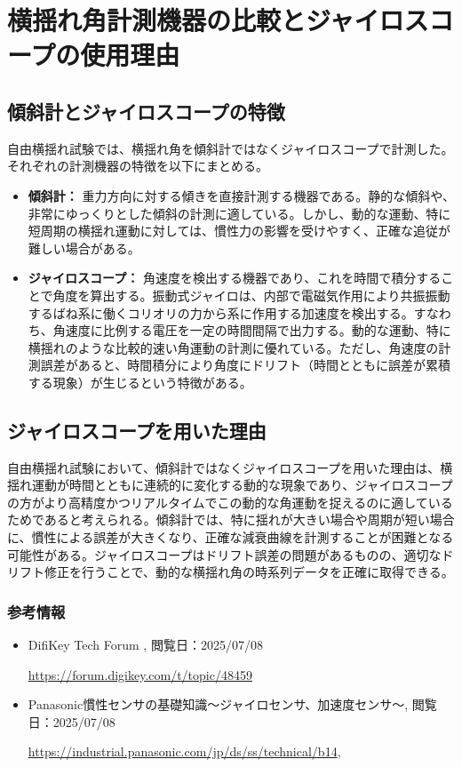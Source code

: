 \documentclass[dvipdfmx,a4paper]{jreport} %
\begin{document}
\section{横揺れ角計測機器の比較とジャイロスコープの使用理由}
\subsection{傾斜計とジャイロスコープの特徴}
自由横揺れ試験では、横揺れ角を傾斜計ではなくジャイロスコープで計測した。それぞれの計測機器の特徴を以下にまとめる。
\begin{itemize}
    \item \textbf{傾斜計：} 重力方向に対する傾きを直接計測する機器である。静的な傾斜や、非常にゆっくりとした傾斜の計測に適している。しかし、動的な運動、特に短周期の横揺れ運動に対しては、慣性力の影響を受けやすく、正確な追従が難しい場合がある。
    \item \textbf{ジャイロスコープ：} 角速度を検出する機器であり、これを時間で積分することで角度を算出する。振動式ジャイロは、内部で電磁気作用により共振振動するばね系に働くコリオリの力から系に作用する加速度を検出する。すなわち、角速度に比例する電圧を一定の時間間隔で出力する。動的な運動、特に横揺れのような比較的速い角運動の計測に優れている。ただし、角速度の計測誤差があると、時間積分により角度にドリフト（時間とともに誤差が累積する現象）が生じるという特徴がある。
\end{itemize}

\subsection{ジャイロスコープを用いた理由}
自由横揺れ試験において、傾斜計ではなくジャイロスコープを用いた理由は、横揺れ運動が時間とともに連続的に変化する動的な現象であり、ジャイロスコープの方がより高精度かつリアルタイムでこの動的な角運動を捉えるのに適しているためであると考えられる。傾斜計では、特に揺れが大きい場合や周期が短い場合に、慣性による誤差が大きくなり、正確な減衰曲線を計測することが困難となる可能性がある。ジャイロスコープはドリフト誤差の問題があるものの、適切なドリフト修正を行うことで、動的な横揺れ角の時系列データを正確に取得できる。

\subsubsection*{参考情報}
\begin{itemize}
    \item DifiKey Tech Forum , 閲覧日：2025/07/08
    
    \url{https://forum.digikey.com/t/topic/48459}
    
    \item Panasonic慣性センサの基礎知識～ジャイロセンサ、加速度センサ～, 閲覧日：2025/07/08

\url{https://industrial.panasonic.com/jp/ds/ss/technical/b14},

\end{itemize}
\end{document}
